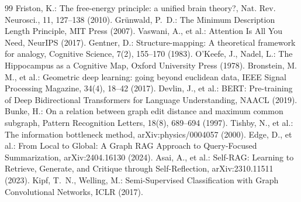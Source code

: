 \begin{thebibliography}{99}
 Friston, K.: The free-energy principle: a unified brain theory?, Nat. Rev. Neurosci., 11, 127--138 (2010).
 Gr\"{u}nwald, P.~D.: The Minimum Description Length Principle, MIT Press (2007).
 Vaswani, A., et al.: Attention Is All You Need, NeurIPS (2017).
 Gentner, D.: Structure-mapping: A theoretical framework for analogy, Cognitive Science, 7(2), 155--170 (1983).
 O'Keefe, J., Nadel, L.: The Hippocampus as a Cognitive Map, Oxford University Press (1978).
 Bronstein, M. M., et al.: Geometric deep learning: going beyond euclidean data, IEEE Signal Processing Magazine, 34(4), 18--42 (2017).
 Devlin, J., et al.: BERT: Pre-training of Deep Bidirectional Transformers for Language Understanding, NAACL (2019).
 Bunke, H.: On a relation between graph edit distance and maximum common subgraph, Pattern Recognition Letters, 18(8), 689--694 (1997).
 Tishby, N., et al.: The information bottleneck method, arXiv:physics/0004057 (2000).
 Edge, D., et al.: From Local to Global: A Graph RAG Approach to Query-Focused Summarization, arXiv:2404.16130 (2024).
 Asai, A., et al.: Self-RAG: Learning to Retrieve, Generate, and Critique through Self-Reflection, arXiv:2310.11511 (2023).
 Kipf, T.~N., Welling, M.: Semi-Supervised Classification with Graph Convolutional Networks, ICLR (2017).

\end{thebibliography}


